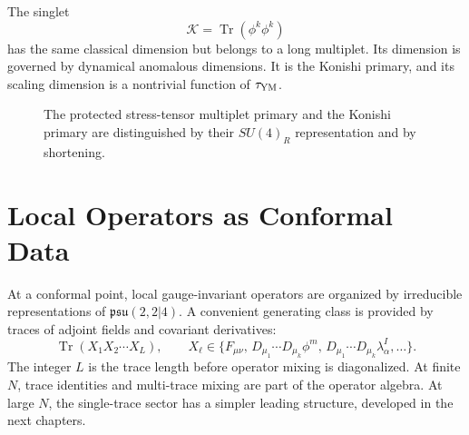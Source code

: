 The singlet
\[
  \mathcal K=\operatorname{Tr}(\phi^k\phi^k)
\]
has the same classical dimension but belongs to a long multiplet.  Its
dimension is governed by dynamical anomalous dimensions.  It is the Konishi
primary, and its scaling dimension is a nontrivial function of
\(\tau_{\rm YM}\).

\begin{figure}[H]
  \centering
  \caption{The protected stress-tensor multiplet primary and the Konishi
  primary are distinguished by their \(SU(4)_R\) representation and by
  shortening.}
  \label{fig:n4-protected-versus-konishi}
\end{figure}

\section{Local Operators as Conformal Data}

At a conformal point, local gauge-invariant operators are organized by
irreducible representations of \(\mathfrak{psu}(2,2|4)\).  A convenient
generating class is provided by traces of adjoint fields and covariant
derivatives:
\[
  \operatorname{Tr}
  \left(
    X_1X_2\cdots X_L
  \right),
  \qquad
  X_\ell\in
  \{F_{\mu\nu},\,D_{\mu_1}\cdots D_{\mu_k}\phi^m,\,
    D_{\mu_1}\cdots D_{\mu_k}\lambda^I_\alpha,\ldots\}.
\]
The integer \(L\) is the trace length before operator mixing is diagonalized.
At finite \(N\), trace identities and multi-trace mixing are part of the
operator algebra.  At large \(N\), the single-trace sector has a simpler
leading structure, developed in the next chapters.
